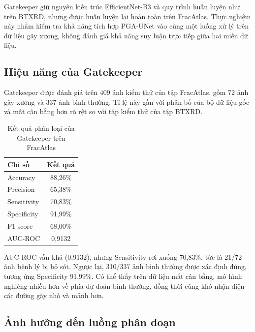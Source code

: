 Gatekeeper giữ nguyên kiến trúc EfficientNet-B3 và quy trình huấn luyện như trên BTXRD, nhưng được huấn luyện lại hoàn toàn trên FracAtlas. Thực nghiệm này nhằm kiểm tra khả năng tích hợp PGA-UNet vào cùng một luồng xử lý trên dữ liệu gãy xương, không đánh giá khả năng suy luận trực tiếp giữa hai miền dữ liệu.

\subsection{Hiệu năng của Gatekeeper}
\label{subsec:gatekeeper_fa}

Gatekeeper được đánh giá trên 409 ảnh kiểm thử của tập FracAtlas, gồm 72 ảnh gãy xương và 337 ảnh bình thường. Tỉ lệ này gần với phân bố của bộ dữ liệu gốc và mất cân bằng hơn rõ rệt so với tập kiểm thử của tập BTXRD.

\begin{table}[htbp]
    \centering
    \caption{Kết quả phân loại của Gatekeeper trên FracAtlas}
    \label{tab:classification_results_fa}
    \renewcommand{\arraystretch}{1.3}
    \begin{tabular}{|p{7.5cm}|c|}
        \hline
        \textbf{Chỉ số} & \textbf{Kết quả} \\
        \hline
        Accuracy & 88,26\% \\
        \hline
        Precision & 65,38\% \\
        \hline
        Sensitivity & 70,83\% \\
        \hline
        Specificity & 91,99\% \\
        \hline
        F1-score & 68,00\% \\
        \hline
        AUC-ROC & 0,9132 \\
        \hline
    \end{tabular}
\end{table}

AUC-ROC vẫn khá (0,9132), nhưng Sensitivity rơi xuống 70,83\%, tức là 21/72 ảnh bệnh lý bị bỏ sót. Ngược lại, 310/337 ảnh bình thường được xác định đúng, tương ứng Specificity 91,99\%. Có thể thấy trên dữ liệu mất cân bằng, mô hình nghiêng nhiều hơn về phía dự đoán bình thường, đồng thời cũng khó nhận diện các đường gãy nhỏ và mảnh hơn.

\subsection{Ảnh hưởng đến luồng phân đoạn}
\label{subsec:pipeline_eval_fa}

